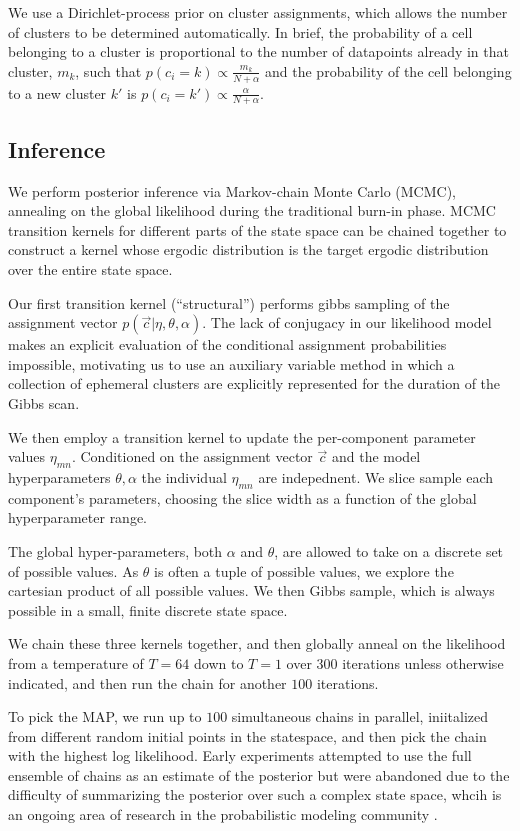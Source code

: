 \documentclass{article}
\begin{document}
We use a Dirichlet-process prior on cluster assignments, which allows
the number of clusters to be determined automatically. In brief, the
probability of a cell belonging to a cluster is proportional to the
number of datapoints already in that cluster, $m_k$, such that $p(c_i
= k) \propto \frac{m_k}{N + \alpha}$ and the probability of the cell
belonging to a new cluster $k'$ is $p(c_i = k') \propto
\frac{\alpha}{N + \alpha}$.


\subsection{Inference} 
We perform posterior inference via Markov-chain Monte Carlo (MCMC),
annealing on the global likelihood during the traditional burn-in
phase. MCMC transition kernels for different parts of the state space
can be chained together to construct a kernel whose ergodic
distribution is the target ergodic distribution over the entire state space. 

Our first transition kernel (``structural'') performs gibbs sampling 
of the assignment vector $p(\vec{c} | \eta, \theta, \alpha)$. 
The lack of conjugacy in our likelihood model makes an explicit 
evaluation of the conditional assignment probabilities impossible, 
motivating us to use an auxiliary variable method \autocite{Neal2000}
in which a collection of ephemeral clusters are explicitly represented
for the duration of the Gibbs scan. 

We then employ a transition kernel to update the per-component
parameter values $\eta_{mn}$. Conditioned on the assignment vector
$\vec{c}$ and the model hyperparameters $\theta, \alpha$ the 
individual $\eta_{mn}$ are indepednent. We slice sample \autocite{NealSlice}
each component's parameters, choosing the slice width as a function
of the global hyperparameter range. 

The global hyper-parameters, both $\alpha$ and $\theta$, are allowed
to take on a discrete set of possible values. As $\theta$ is often a
tuple of possible values, we explore the cartesian product of all
possible values. We then Gibbs sample, which is always possible in a 
small, finite discrete state space. 

We chain these three kernels together, and then globally
anneal on the likelihood from a temperature of $T=64$ down to 
$T=1$ over 300 iterations unless otherwise indicated, and
then run the chain for another $100$ iterations. 

To pick the MAP, we run up to $100$ simultaneous chains in parallel,
iniitalized from different random initial points in the statespace,
and then pick the chain with the highest log likelihood. Early
experiments attempted to use the full ensemble of chains as an
estimate of the posterior but were abandoned due to the difficulty of
summarizing the posterior over such a complex state space, whcih is an
ongoing area of research in the probabilistic modeling community
\autocite{}.
\end{document}
